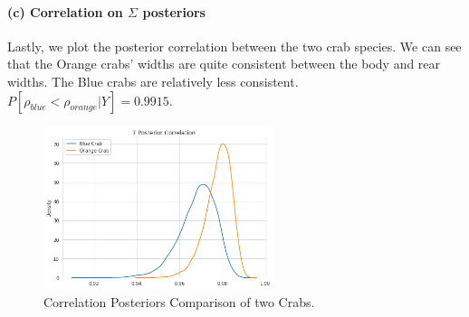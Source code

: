 \documentclass[11pt, letterpaper]{article}
\begin{document}
\paragraph{(c) Correlation on $\Sigma$ posteriors}
Lastly, we plot the posterior correlation between the two crab species. We can see that the Orange crabs' widths are quite consistent between the body and rear widths. The Blue crabs are relatively less consistent. $P[\rho_{blue} < \rho_{orange}|Y] = 0.9915$.
\begin{figure}[!h]
  \centering
  \includegraphics[width=0.6\textwidth]{3.2.png}
  \captionsetup{justification=centering}
  \caption{Correlation Posteriors Comparison of two Crabs. }
\end{figure}
\end{document}
